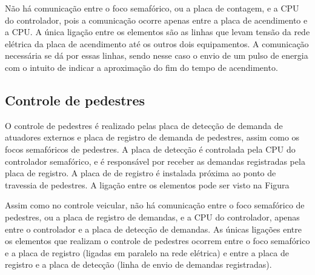 Não há comunicação entre o foco semafórico, ou a placa de contagem, e a \ac{CPU} do controlador, pois a comunicação ocorre apenas entre a placa de acendimento e a \ac{CPU}. A única ligação entre os elementos são as linhas que levam tensão da rede elétrica da placa de acendimento até os outros dois equipamentos. A comunicação necessária se dá por essas linhas, sendo nesse caso o envio de um pulso de energia com o intuito de indicar a aproximação do fim do tempo de acendimento.

\subsection{Controle de pedestres}

O controle de pedestres é realizado pelas placa de detecção de demanda de atuadores externos e placa de registro de demanda de pedestres, assim como os focos semafóricos de pedestres. A placa de detecção é controlada pela \ac{CPU} do controlador semafórico, e é responsável por receber as demandas registradas pela placa de registro. A placa de de registro é instalada próxima ao ponto de travessia de pedestres. A ligação entre os elementos pode ser visto na Figura

Assim como no controle veicular, não há comunicação entre o foco semafórico de pedestres, ou a placa de registro de demandas, e a \ac{CPU} do controlador, apenas entre o controlador e a placa de detecção de demandas. As únicas ligações entre os elementos que realizam o controle de pedestres ocorrem entre o foco semafórico e a placa de registro (ligadas em paralelo na rede elétrica) e entre a placa de registro e a placa de detecção (linha de envio de demandas registradas). 